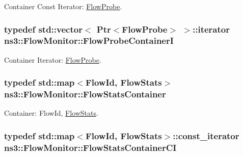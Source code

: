 Container Const Iterator\+: \hyperlink{classns3_1_1FlowProbe}{Flow\+Probe}. 

\subsubsection[{\texorpdfstring{Flow\+Probe\+ContainerI}{FlowProbeContainerI}}]{\setlength{\rightskip}{0pt plus 5cm}typedef std\+::vector$<$ {\bf Ptr}$<${\bf Flow\+Probe}$>$ $>$\+::iterator {\bf ns3\+::\+Flow\+Monitor\+::\+Flow\+Probe\+ContainerI}}\hypertarget{classns3_1_1FlowMonitor_ae3836bab362fd4a699288a142aa8146a}{}\label{classns3_1_1FlowMonitor_ae3836bab362fd4a699288a142aa8146a}


Container Iterator\+: \hyperlink{classns3_1_1FlowProbe}{Flow\+Probe}. 

\subsubsection[{\texorpdfstring{Flow\+Stats\+Container}{FlowStatsContainer}}]{\setlength{\rightskip}{0pt plus 5cm}typedef std\+::map$<${\bf Flow\+Id}, {\bf Flow\+Stats}$>$ {\bf ns3\+::\+Flow\+Monitor\+::\+Flow\+Stats\+Container}}\hypertarget{classns3_1_1FlowMonitor_a6dc86073dee117ed141b8871990c074f}{}\label{classns3_1_1FlowMonitor_a6dc86073dee117ed141b8871990c074f}


Container\+: Flow\+Id, \hyperlink{structns3_1_1FlowMonitor_1_1FlowStats}{Flow\+Stats}. 

\subsubsection[{\texorpdfstring{Flow\+Stats\+Container\+CI}{FlowStatsContainerCI}}]{\setlength{\rightskip}{0pt plus 5cm}typedef std\+::map$<${\bf Flow\+Id}, {\bf Flow\+Stats}$>$\+::const\+\_\+iterator {\bf ns3\+::\+Flow\+Monitor\+::\+Flow\+Stats\+Container\+CI}}\hypertarget{classns3_1_1FlowMonitor_a877e8f8629ab3d39b7c320c8900de46a}{}\label{classns3_1_1FlowMonitor_a877e8f8629ab3d39b7c320c8900de46a}



